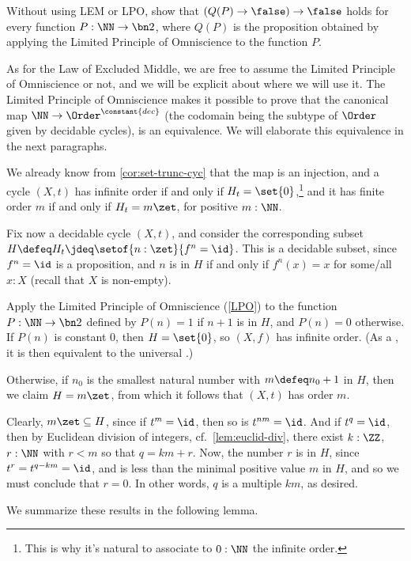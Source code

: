 \begin{xca}\label{xca:not-not-lpoP}
  Without using LEM or LPO, show that $(Q(P)\to\false)\to\false$ holds
  for every function $P:\NN\to\bn 2$, where $Q(P)$ is the proposition obtained
  by applying the Limited Principle of Omniscience to the function $P$.
\end{xca}

As for the Law of Excluded Middle, we are free to assume the Limited Principle of Omniscience
or not, and we will be explicit about where we will use it.
The Limited Principle of Omniscience makes it possible to prove that the canonical map
$\NN \to \Order^{\constant{dec}}$
(the codomain being the subtype of $\Order$ given by decidable cycles),
is an equivalence.
We will elaborate this equivalence in the next paragraphs.

We already know from \cref{cor:set-trunc-cyc} that the map is an injection,
and a cycle $(X,t)$ has infinite order
if and only if $H_t=\set{0}$,\footnote{%
  This is why it's natural to associate to $0:\NN$
  the infinite order.}
and it has finite order $m$
if and only if $H_t=m\zet$, for positive $m:\NN$.

Fix now a decidable cycle $(X,t)$,
and consider the corresponding subset $H \defeq H_t \jdeq \setof{n:\zet}{f^n=\id}$.
This is a decidable subset, since $f^n=\id$ is a proposition, and $n$ is in $H$
if and only if $f^n(x)=x$ for some/all $x:X$ (recall that $X$ is non-empty).

Apply the Limited Principle of Omniscience (\cref{LPO}) to the function $P:\NN\to\bn 2$ defined
by $P(n)=1$ if $n+1$ is in $H$, and $P(n)=0$ otherwise.
If $P(n)$ is constant $0$, then $H=\set{0}$,
so $(X,f)$ has infinite order.
(As a \covering, it is then equivalent to the universal \covering.)

Otherwise, if $n_0$ is the smallest natural number with $m\defeq n_0+1$ in $H$,
then we claim $H=m\zet$,
from which it follows that $(X,t)$ has order $m$.

Clearly, $m\zet \subseteq H$, since if $t^m=\id$, then so is $t^{nm}=\id$.
And if $t^q=\id$, then by Euclidean division of integers, cf.~\cref{lem:euclid-div},
there exist $k:\ZZ$, $r:\NN$ with $r<m$ so that $q=km+r$.
Now, the number $r$ is in $H$, since $t^r=t^{q-km}=\id$,
and is less than the minimal positive value $m$ in $H$,
and so we must conclude that $r=0$.
In other words, $q$ is a multiple $km$, as desired.

We summarize these results in the following lemma.

